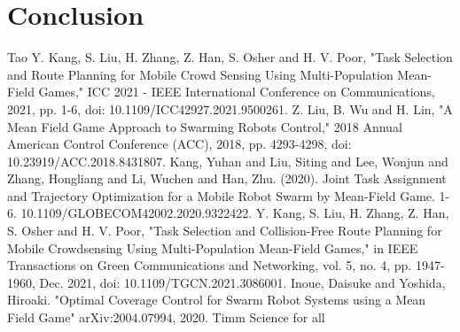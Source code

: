 \documentclass[a4paper, 10pt, conference]{ieeeconf}      %
\begin{document}
\section{Conclusion}

     

\begin{thebibliography}{99}

	 Tao
	 Y. Kang, S. Liu, H. Zhang, Z. Han, S. Osher and H. V. Poor, "Task Selection and Route Planning for Mobile Crowd Sensing Using Multi-Population Mean-Field Games," ICC 2021 - IEEE International Conference on Communications, 2021, pp. 1-6, doi: 10.1109/ICC42927.2021.9500261.
	 Z. Liu, B. Wu and H. Lin, "A Mean Field Game Approach to Swarming Robots Control," 2018 Annual American Control Conference (ACC), 2018, pp. 4293-4298, doi: 10.23919/ACC.2018.8431807.
	 Kang, Yuhan and Liu, Siting and Lee, Wonjun and Zhang, Hongliang and Li, Wuchen and Han, Zhu. (2020). Joint Task Assignment and Trajectory Optimization for a Mobile Robot Swarm by Mean-Field Game. 1-6. 10.1109/GLOBECOM42002.2020.9322422.  
	 Y. Kang, S. Liu, H. Zhang, Z. Han, S. Osher and H. V. Poor, "Task Selection and Collision-Free Route Planning for Mobile Crowdsensing Using Multi-Population Mean-Field Games," in IEEE Transactions on Green Communications and Networking, vol. 5, no. 4, pp. 1947-1960, Dec. 2021, doi: 10.1109/TGCN.2021.3086001.
	 Inoue, Daisuke and Yoshida, Hiroaki. "Optimal Coverage Control for Swarm Robot Systems using a Mean Field Game" arXiv:2004.07994, 2020.
	 Timm
	 Science for all

\end{thebibliography}
\end{document}
